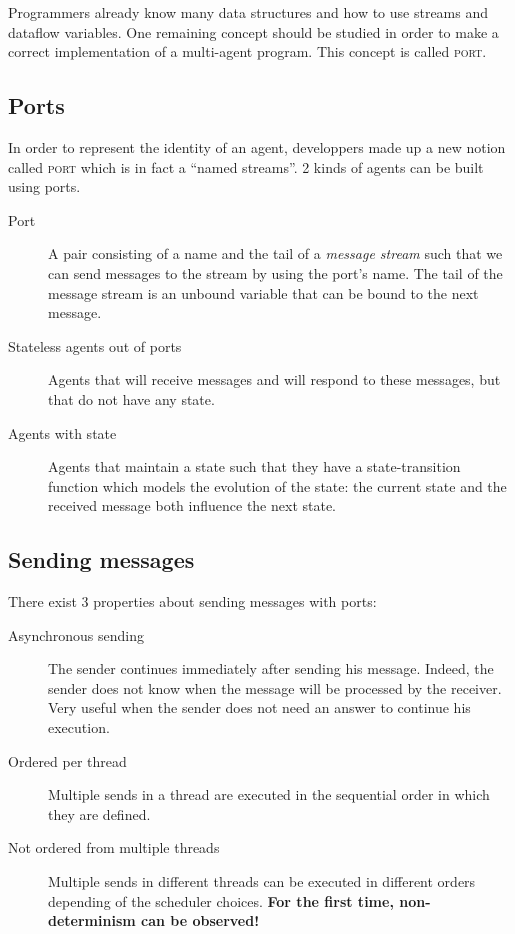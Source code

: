 \documentclass[11pt,a4paper,twoside,openright]{report}
\begin{document}
Programmers already know many data structures and how to use streams and 
dataflow variables. One remaining concept should be studied in order to make a 
correct implementation of a multi-agent program. This concept is called 
\textsc{port}.

\subsection{Ports}
In order to represent the identity of an agent, developpers made up a new 
notion called \textsc{port} which is in fact a \enquote{named streams}. 2 kinds 
of agents can be built using ports.

\begin{description}
 \item[Port] A pair consisting of a name and the tail of a \textit{message 
stream} such that we can send messages to the stream by using the port's name. 
The tail of the message stream is an unbound variable that can be bound to the 
next message.
  \item[Stateless agents out of ports] Agents that will receive messages and 
will respond to these messages, but that do not have any state.
 \item[Agents with state] Agents that maintain a state such that they have a 
state-transition function which models the evolution of the state: the current 
state and the received message both 	influence the next state.
\end{description}

\subsection{Sending messages}

There exist 3 properties about sending messages with ports:

\begin{description}
	\item[Asynchronous sending] The sender continues immediately after 
sending his message. Indeed, the sender does not know when the message will be 
processed by the receiver. Very useful when the sender does not need an answer 
to continue his execution.
	\item[Ordered per thread] Multiple sends in a thread are executed in 
the sequential order in which they are defined.
	\item[Not ordered from multiple threads] Multiple sends in different 
threads can be executed in different orders depending of the scheduler choices. 
\textbf{For the first time, non-determinism can be observed!} 
\end{description}
\end{document}
